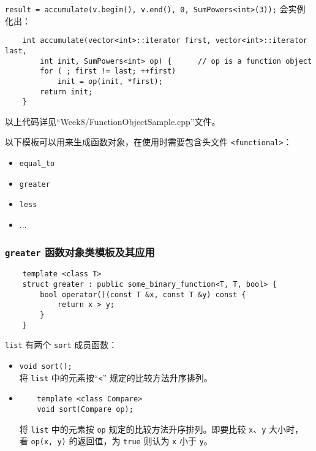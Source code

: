 \documentclass[UTF8]{ctexart}
\begin{document}
\texttt{result = accumulate(v.begin(), v.end(), 0, SumPowers<int>(3));} 会实例化出：
\begin{verbatim}
    int accumulate(vector<int>::iterator first, vector<int>::iterator last,
        int init, SumPowers<int> op) {      // op is a function object
        for ( ; first != last; ++first)
            init = op(init, *first);
        return init;
    }
\end{verbatim}

以上代码详见``Week8/FunctionObjectSample.cpp''文件。

以下模板可以用来生成函数对象，在使用时需要包含头文件 \texttt{<functional>}：
\begin{itemize}
    \item \texttt{equal\_to}
    \item \texttt{greater}
    \item \texttt{less}
    \item ...
\end{itemize}

\subsubsection{\texttt{greater} 函数对象类模板及其应用}
\begin{verbatim}
    template <class T>
    struct greater : public some_binary_function<T, T, bool> {
        bool operator()(const T &x, const T &y) const {
            return x > y;
        }
    }
\end{verbatim}

\texttt{list} 有两个 \texttt{sort} 成员函数：
\begin{itemize}
    \item \texttt{void sort();} \\
    将 \texttt{list} 中的元素按“\texttt{<}” 规定的比较方法升序排列。
    \item
    \begin{verbatim}
    template <class Compare>
    void sort(Compare op);
    \end{verbatim}
    将 \texttt{list} 中的元素按 \texttt{op} 规定的比较方法升序排列。即要比较 \texttt{x}、\texttt{y} 大小时，
    看 \texttt{op(x, y)} 的返回值，为 \texttt{true} 则认为 \texttt{x} 小于 \texttt{y}。
\end{itemize}
\end{document}
